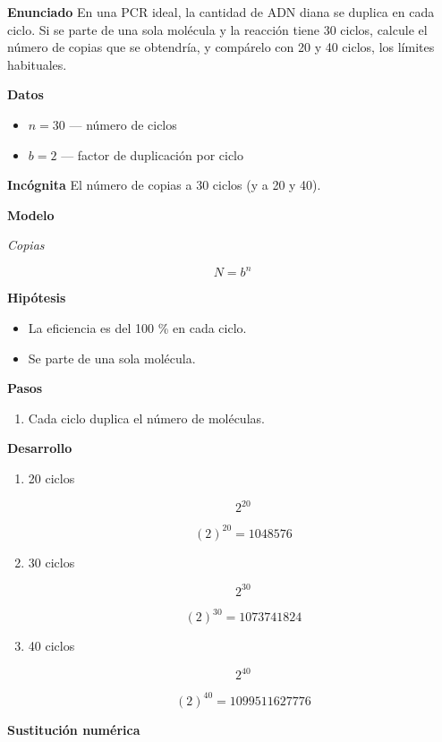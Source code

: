 \documentclass{book}
\begin{document}
\begin{tcolorbox}[title={Problema resuelto}, studiumworked, breakable]

\noindent\textbf{Enunciado}
En una PCR ideal, la cantidad de ADN diana se duplica en cada ciclo. Si se parte de una sola molécula y la reacción tiene 30 ciclos, calcule el número de copias que se obtendría, y compárelo con 20 y 40 ciclos, los límites habituales.


\noindent\textbf{Datos}
\begin{itemize}
\item $n = 30$ — número de ciclos
\item $b = 2$ — factor de duplicación por ciclo
\end{itemize}

\noindent\textbf{Incógnita}
El número de copias a 30 ciclos (y a 20 y 40).


\noindent\textbf{Modelo}

\noindent\textit{Copias}

\[
N = b^{n}
\]

\noindent\textbf{Hipótesis}
\begin{itemize}
\item La eficiencia es del 100 \% en cada ciclo.
\item Se parte de una sola molécula.
\end{itemize}

\noindent\textbf{Pasos}
\begin{enumerate}
\item
Cada ciclo duplica el número de moléculas.

\end{enumerate}

\noindent\textbf{Desarrollo}
\begin{enumerate}
\item
20 ciclos


\[
2^{20}
\]

\[
\left(2\right)^{20} = 1048576
\]
\item
30 ciclos


\[
2^{30}
\]

\[
\left(2\right)^{30} = 1073741824
\]
\item
40 ciclos


\[
2^{40}
\]

\[
\left(2\right)^{40} = 1099511627776
\]
\end{enumerate}

\noindent\textbf{Sustitución numérica}


\end{tcolorbox}
\end{document}
